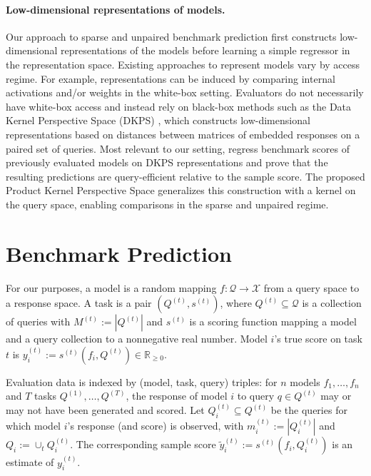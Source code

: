\documentclass{article}
\theoremstyle{definition}
\theoremstyle{remark}
\theoremstyle{plain}
\begin{document}
\paragraph{Low-dimensional representations of models.}
Our approach to sparse and unpaired benchmark prediction first constructs low-dimensional representations of the models before learning a simple regressor in the representation space.
Existing approaches to represent models vary by access regime.
For example, representations can be induced by comparing internal activations
\citep{duderstadt2023comparing, huh2024platonic} and/or weights
\citep{chen2025weights} in the white-box setting.
Evaluators do not necessarily have white-box access and instead rely on black-box methods such as
the Data Kernel Perspective Space (DKPS) \citep{helm2024tracking,helm2025inference}, which constructs low-dimensional representations based on distances between matrices of embedded responses on a paired set of queries.
Most relevant to our setting, \citet{dkps_qeff} regress benchmark scores of
previously evaluated models on DKPS representations and prove that the resulting
predictions are query-efficient relative to the sample score.
The proposed Product Kernel Perspective Space generalizes this construction with a kernel on the query space, enabling comparisons in the sparse and unpaired regime.

\section{Benchmark Prediction}
\label{sec:setting}
For our purposes, a model is a random mapping
$f:\mathcal{Q}\to\mathcal{X}$ from a query space to a response space.
A task is a pair $(Q^{(t)}, s^{(t)})$, where $Q^{(t)}\subseteq\mathcal{Q}$ is a
collection of queries with $M^{(t)}:=|Q^{(t)}|$ and $s^{(t)}$ is a scoring function
mapping a model and a query collection to a nonnegative real number. 
Model $i$'s true score on task
$t$ is $y_i^{(t)}:=s^{(t)}(f_{i},Q^{(t)}) \in \mathbb{R}_{\ge 0}$.

Evaluation data is indexed by (model, task, query) triples: for $n$ models
$f_1,\dots,f_n$ and $T$ tasks $Q^{(1)},\dots,Q^{(T)}$, the response of model $i$ to
query $q\in Q^{(t)}$ may or may not have been generated and scored.
Let $Q_{i}^{(t)}\subseteq Q^{(t)}$ be the queries for which model $i$'s response (and score) is
observed, with $m_{i}^{(t)}:=|Q^{(t)}_{i}|$ and $Q_i:=\cup_{t}Q_i^{(t)}$.
The corresponding sample score
$\tilde{y}_{i}^{(t)}:=s^{(t)}(f_{i},Q_{i}^{(t)})$ is an estimate of
$y_{i}^{(t)}$.
\end{document}

